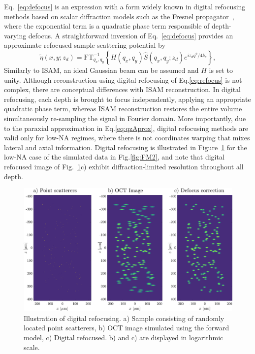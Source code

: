 Eq.~\eqref{eq:defocus} is an expression with a form widely known in digital refocusing methods based on scalar diffraction models such as the Fresnel propagator~\cite{}, where the exponential term is a quadratic phase term responsible of depth-varying defocus. A straightforward inversion of Eq.~\eqref{eq:defocus} provides an approximate refocused sample scattering potential by
\begin{equation}\label{eq:refocus}
    \tilde{\eta}(x,y; z_d) = \text{FT}^{-1}_{q_x, q_y}\left\{H(q_x, q_y)\hat{S}(q_x, q_y; z_d) e^{iz_dq^2/4k_c}\right\},
\end{equation}
Similarly to ISAM, an ideal Gaussian beam can be assumed and $H$ is set to unity.
Although reconstruction using digital refocusing of Eq.\eqref{eq:refocus} is not complex, there are conceptual differences with ISAM reconstruction. In digital refocusing, each depth is brought to focus independently, applying an appropriate quadratic phase term, whereas ISAM reconstruction restores the entire volume simultaneously re-sampling the signal in Fourier domain. More importantly, due to the paraxial approximation in Eq.\eqref{eq:qzAprox}, digital refocusing methods are valid only for low-NA regimes, where there is not coordinates warping that mixes lateral and axial information. Digital refocusing is illustrated in Figure~\ref{fig:IM2} for the low-NA case of the simulated data in Fig.\ref{fig:FM2}, and note that digital refocused image of Fig.~\ref{fig:IM2}c) exhibit diffraction-limited resolution throughout all depth.

\begin{figure}[htb!]
    \centering
    \includegraphics[width=\textwidth]{Figures/TheoreticalBasis/IM2.pdf}
    \caption{Illustration of digital refocusing. a) Sample consisting of randomly located point scatterers, b) OCT image simulated using the forward model, c) Digital refocused. b) and c) are displayed in logarithmic scale.}
    \label{fig:IM2}
\end{figure}

